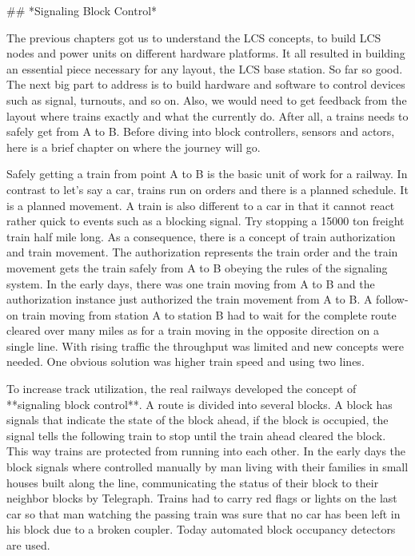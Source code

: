 ## *Signaling Block Control*

The previous chapters got us to understand the LCS concepts, to build LCS nodes and power units on different hardware platforms. It all resulted in building an essential piece necessary for any layout, the LCS base station. So far so good. The next big part to address is to build hardware and software to control devices such as signal, turnouts, and so on. Also, we would need to get feedback from the layout where trains exactly and what the currently do. After all, a trains needs to safely get from A to B. Before diving into block controllers, sensors and actors, here is a brief chapter on where the journey will go.

Safely getting a train from point A to B is the basic unit of work for a railway. In contrast to let's say a car, trains run on orders and there is a planned schedule. It is a planned movement. A train is also different to a car in that it cannot react rather quick to events such as a blocking signal. Try stopping a 15000 ton freight train half mile long. As a consequence, there is a concept of train authorization and train movement. The authorization represents the train order and the train movement gets the train safely from A to B obeying the rules of the signaling system. In the early days, there was one train moving from A to B and the authorization instance just authorized the train movement from A to B. A follow-on train moving from station A to station B had to wait for the complete route cleared over many miles as for a train moving in the opposite direction on a single line. With rising traffic the throughput was limited and new concepts were needed. One obvious solution was higher train speed and using two lines.

To increase track utilization, the real railways developed the concept of **signaling block control**. A route is divided into several blocks. A block has signals that indicate the state of the block ahead, if the block is occupied, the signal tells the following train to stop until the train ahead cleared the block. This way trains are protected from running into each other. In the early days the block signals where controlled manually by man living with their families in small houses built along the line, communicating the status of their block to their neighbor blocks by Telegraph. Trains had to carry red flags or lights on the last car so that man watching the passing train was sure that no car has been left in his block due to a broken coupler. Today automated block occupancy detectors are used.

